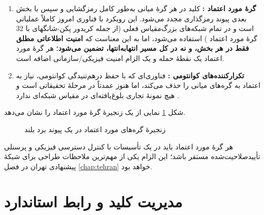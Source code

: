\begin{enumerate}
\item \textbf{گرهٔ مورد اعتماد :} کلید در هر گرهٔ میانی به‌طور کامل رمزگشایی و سپس با بخش بعدی پیوند رمزگذاری مجدد می‌شود. این رویکرد با فناوری امروز کاملاً عملیاتی است و در تمام شبکه‌های بزرگ‌مقیاس فعلی (از جمله کریدور پکن-شانگهای با $32$ گرهٔ مورد اعتماد \Cite{jrc2019qkd}) استفاده می‌شود، اما به این معناست که \textbf{امنیت اطلاعاتی مطلق فقط در هر بخش، و نه در کل مسیر انتها‌به‌انتها، تضمین می‌شود}؛ هر گرهٔ مورد اعتماد یک نقطهٔ حمله و یک الزام امنیت فیزیکی/سازمانی اضافه است.
\item \textbf{تکرارکننده‌های کوانتومی :} فناوری‌ای که با حفظ درهم‌تنیدگی کوانتومی، نیاز به اعتماد به گره‌های میانی را حذف می‌کند، اما هنوز عمدتاً در مرحلهٔ تحقیقاتی است و هیچ نمونهٔ تجاری بلوغ‌یافته‌ای در مقیاس شبکه‌ای ندارد \Cite{npjqi2016}.
\end{enumerate}

شکل \ref{fig:trustednode} نمایی از یک زنجیرهٔ گرهٔ مورد اعتماد را نشان می‌دهد.

\begin{figure}[htbp]
\centering
{}
\caption{زنجیرهٔ گره‌های مورد اعتماد در یک پیوند  برد بلند}
\label{fig:trustednode}
\end{figure}

هر گرهٔ مورد اعتماد باید در یک تأسیسات با کنترل دسترسی فیزیکی و پرسنلی تأییدصلاحیت‌شده مستقر باشد؛ این الزام یکی از مهم‌ترین ملاحظات طراحی برای شبکهٔ پیشنهادی تهران در فصل \ref{chap:tehran} خواهد بود.

\section{مدیریت کلید و رابط استاندارد }

